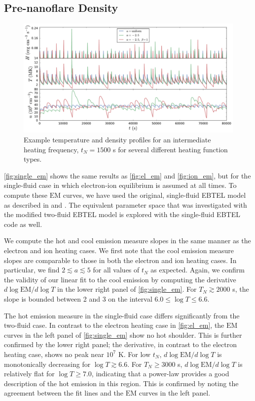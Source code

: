 \documentclass[apj]{emulateapj}
\begin{document}
	\subsection{Pre-nanoflare Density}
	\label{subsec:pre_nanoflare_density}
	\begin{figure}
		\centering
		\includegraphics[width=2\columnwidth]{figures/nT_sample_curves_tn1500_electron.pdf}
		\caption{Example temperature and density profiles for an intermediate heating frequency, $t_N=1500$ s for several different heating function types.}
	\end{figure}
	\par \autoref{fig:single_em} shows the same results as \autoref{fig:el_em} and \autoref{fig:ion_em}, but for the single-fluid case in which electron-ion equilibrium is assumed at all times. To compute these $\mathrm{EM}$ curves, we have used the original, single-fluid EBTEL model as described in \citet{klimchuk_highly_2008} and \citet{cargill_enthalpy-based_2012}. The equivalent parameter space that was investigated with the modified two-fluid EBTEL model is explored with the single-fluid EBTEL code as well.
	\par We compute the hot and cool emission measure slopes in the same manner as the electron and ion heating cases. We first note that the cool emission measure slopes are comparable to those in both the electron and ion heating cases. In particular, we find $2\lesssim a\lesssim5$ for all values of $t_N$ as expected. Again, we confirm the validity of our linear fit to the cool emission by computing the derivative $d\log{\mathrm{EM}}/d\log{T}$ in the lower right panel of \autoref{fig:single_em}. For $T_N\gtrsim2000$ s, the slope is bounded between 2 and 3 on the interval $6.0\le\log{T}\le6.6$. 
	\par The hot emission measure in the single-fluid case differs significantly from the two-fluid case. In contrast to the electron heating case in \autoref{fig:el_em}, the $\mathrm{EM}$ curves in the left panel of \autoref{fig:single_em} show no hot shoulder. This is further confirmed by the lower right panel; the derivative, in contrast to the electron heating case, shows no peak near $10^7$ K. For low $t_N$, $d\log{\mathrm{EM}}/d\log{T}$ is monotonically decreasing for $\log{T}\gtrsim6.6$. For $T_N\ge3000$ s, $d\log{\mathrm{EM}}/d\log{T}$ is relatively flat for $\log{T}\ge7.0$, indicating that a power-law provides a good description of the hot emission in this region. This is confirmed by noting the agreement between the fit lines and the $\mathrm{EM}$ curves in the left panel.
\end{document}
